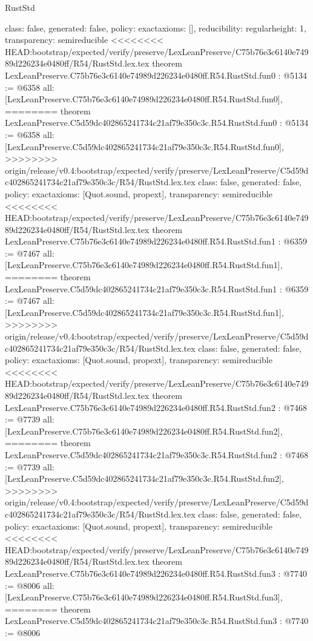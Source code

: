 \begin{lexlean}{RustStd}
\begin{coremodule}
{\begin{coremodule}
{{{  class: false,
  generated: false,
  policy: exact{axioms: []},
  reducibility: regular{height: 1},
  transparency: semireducible
}
<<<<<<<< HEAD:bootstrap/expected/verify/preserve/LexLeanPreserve/C75b76e3c6140e74989d226234e0480ff/R54/RustStd.lex.tex
theorem LexLeanPreserve.C75b76e3c6140e74989d226234e0480ff.R54.RustStd.fun0 : @5134 := @6358 {
  all: [LexLeanPreserve.C75b76e3c6140e74989d226234e0480ff.R54.RustStd.fun0],
========
theorem LexLeanPreserve.C5d59dc402865241734c21af79e350c3c.R54.RustStd.fun0 : @5134 := @6358 {
  all: [LexLeanPreserve.C5d59dc402865241734c21af79e350c3c.R54.RustStd.fun0],
>>>>>>>> origin/release/v0.4:bootstrap/expected/verify/preserve/LexLeanPreserve/C5d59dc402865241734c21af79e350c3c/R54/RustStd.lex.tex
  class: false,
  generated: false,
  policy: exact{axioms: [Quot.sound, propext]},
  transparency: semireducible
}
<<<<<<<< HEAD:bootstrap/expected/verify/preserve/LexLeanPreserve/C75b76e3c6140e74989d226234e0480ff/R54/RustStd.lex.tex
theorem LexLeanPreserve.C75b76e3c6140e74989d226234e0480ff.R54.RustStd.fun1 : @6359 := @7467 {
  all: [LexLeanPreserve.C75b76e3c6140e74989d226234e0480ff.R54.RustStd.fun1],
========
theorem LexLeanPreserve.C5d59dc402865241734c21af79e350c3c.R54.RustStd.fun1 : @6359 := @7467 {
  all: [LexLeanPreserve.C5d59dc402865241734c21af79e350c3c.R54.RustStd.fun1],
>>>>>>>> origin/release/v0.4:bootstrap/expected/verify/preserve/LexLeanPreserve/C5d59dc402865241734c21af79e350c3c/R54/RustStd.lex.tex
  class: false,
  generated: false,
  policy: exact{axioms: [Quot.sound, propext]},
  transparency: semireducible
}
<<<<<<<< HEAD:bootstrap/expected/verify/preserve/LexLeanPreserve/C75b76e3c6140e74989d226234e0480ff/R54/RustStd.lex.tex
theorem LexLeanPreserve.C75b76e3c6140e74989d226234e0480ff.R54.RustStd.fun2 : @7468 := @7739 {
  all: [LexLeanPreserve.C75b76e3c6140e74989d226234e0480ff.R54.RustStd.fun2],
========
theorem LexLeanPreserve.C5d59dc402865241734c21af79e350c3c.R54.RustStd.fun2 : @7468 := @7739 {
  all: [LexLeanPreserve.C5d59dc402865241734c21af79e350c3c.R54.RustStd.fun2],
>>>>>>>> origin/release/v0.4:bootstrap/expected/verify/preserve/LexLeanPreserve/C5d59dc402865241734c21af79e350c3c/R54/RustStd.lex.tex
  class: false,
  generated: false,
  policy: exact{axioms: [Quot.sound, propext]},
  transparency: semireducible
}
<<<<<<<< HEAD:bootstrap/expected/verify/preserve/LexLeanPreserve/C75b76e3c6140e74989d226234e0480ff/R54/RustStd.lex.tex
theorem LexLeanPreserve.C75b76e3c6140e74989d226234e0480ff.R54.RustStd.fun3 : @7740 := @8006 {
  all: [LexLeanPreserve.C75b76e3c6140e74989d226234e0480ff.R54.RustStd.fun3],
========
theorem LexLeanPreserve.C5d59dc402865241734c21af79e350c3c.R54.RustStd.fun3 : @7740 := @8006 {
}}}}}}}
\end{coremodule}}
\end{coremodule}
\end{lexlean}
